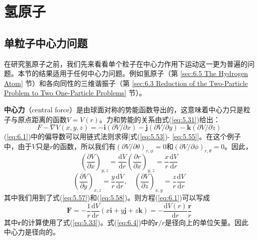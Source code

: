 \chapter{氢原子}
\label{chap:6}
    
\section{单粒子中心力问题}
\label{sec:6.1 The One-Particle Central Force Problem}
    在研究氢原子之前，我们先来看看单个粒子在中心力作用下运动这一更为普遍的问题。本节的结果适用于任何中心力问题。例如氢原子（第 \ref{sec:6.5 The Hydrogen Atom} 节）和各向同性的三维谐振子（第 \ref{sec:6.3 Reduction of the Two-Particle Problem to Two One-Particle Problems} 节）。

    \textbf{中心力}（central force）是由球面对称的势能函数导出的，这意味着中心力只是粒子与原点距离的函数$V = V\left(r\right)$。力和势能的关系由式(\ref{eq:5.31})给出：
    \begin{equation}
        F - \nabla V\left(x,y,z\right) = -\mathbf{i}\left(\partial V/\partial x\right) - \mathbf{j}\left(\partial V/\partial y\right) - \mathbf{k}\left(\partial V/\partial z\right)
        \label{eq:6.1}
    \end{equation}
    (\ref{eq:6.1})中的偏导数可以用链式法则求得[式(\ref{eq:5.53})- \ref{eq:5.55}]。在这个例子中，由于$V$只是$r$的函数，所以我们有$\left(\partial V/\partial\theta\right)_{r,\phi} = 0$和$\left(\partial V/\partial\phi\right)_{r,\theta} = 0$。因此，
    \begin{equation}
        \left(\frac{\partial V}{\partial x}\right)_{y,z} = \frac{\mathrm{d}V}{\mathrm{d}r}\left(\frac{\partial r}{\partial x}\right)_{y,z} = \frac{x}{r}\frac{\mathrm{d}V}{\mathrm{d}r}
        \label{eq:6.2}
    \end{equation}
    \begin{equation}
        \left(\frac{\partial V}{\partial y}\right)_{x,z} = \frac{y}{r}\frac{\mathrm{d}V}{\mathrm{d}r}, \quad \left(\frac{\partial V}{\partial z}\right)_{x,y} = \frac{z}{r}\frac{\mathrm{d}V}{\mathrm{d}r}
        \label{eq:6.3}
    \end{equation}
    其中我们用到了式(\ref{eq:5.57})和(\ref{eq:5.58})。则方程(\ref{eq:6.1})可以写成
    \begin{equation}
        \mathbf{F} = -\frac{1}{r}\frac{\mathrm{d}V}{\mathrm{d}r}\left(x\mathbf{i}+y\mathbf{j}+z\mathbf{k}\right) = -\frac{\mathrm{d}V\left(r\right)}{\mathrm{d}r}\frac{\mathbf{r}}{r}
        \label{eq:6.4}
    \end{equation}
    其中$\mathbf{r}$的计算使用了式(\ref{eq:5.33})。式(\ref{eq:6.4})中的$\mathbf{r}/r$是径向上的单位矢量。因此中心力是径向的。


